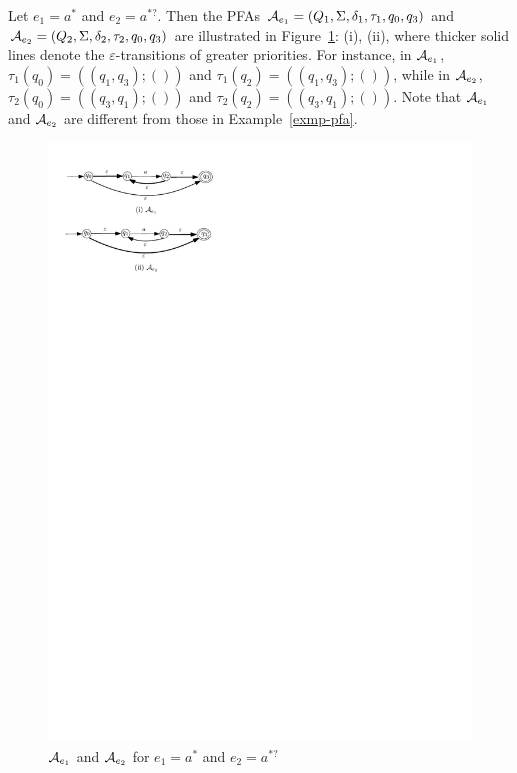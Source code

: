 \begin{example}
Let $e_1 = a^\ast$ and $e_2 = a^{\ast ?}$. Then the PFAs $\mathcal{A}_{e_1} = (Q_1, \Sigma, \delta_1, \tau_1, q_0, q_3)$ and $\mathcal{A}_{e_2} =  (Q_2, \Sigma, \delta_2, \tau_2, q_0, q_3)$ are illustrated in Figure~\ref{fig-retopfa}: (i), (ii), where thicker solid lines denote the $\varepsilon$-transitions of greater priorities. For instance, in $\mathcal{A}_{e_1}$, $\tau_1(q_0) = ((q_1, q_3); ())$ and $\tau_1(q_2) = ((q_1, q_3); ())$, while in $\mathcal{A}_{e_2}$, $\tau_2(q_0) = ((q_3, q_1); ())$ and $\tau_2(q_2) = ((q_3, q_1); ())$. Note that $\mathcal{A}_{e_1}$ and $\mathcal{A}_{e_2}$ are different from those in Example~\ref{exmp-pfa}.
\begin{figure}[ht]
\centering
\includegraphics[scale=0.8]{retopfa.pdf}
\caption{$\mathcal{A}_{e_1}$ and $\mathcal{A}_{e_2}$ for $e_1= a^\ast$ and $e_2 = a^{\ast?}$}
\label{fig-retopfa}
\end{figure}
\end{example}
 
